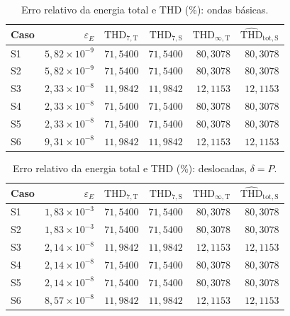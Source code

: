 \begin{table}[H]
\centering
\footnotesize\setlength{\tabcolsep}{2pt}
\caption{Erro relativo da energia total e THD (\%): ondas básicas.}\label{tab:thd1}
\begin{tabular}{lrrrrr}\hline
Caso & $\varepsilon_E$ & $\mathrm{THD}_{7,\mathrm T}$ & $\mathrm{THD}_{7,\mathrm S}$ & $\mathrm{THD}_{\infty,\mathrm T}$ & $\widehat{\mathrm{THD}}_{\mathrm{tot},\mathrm S}$ \\ \hline
S1 & $5{,}82\!\times\!10^{-9}$ & $71{,}5400$ & $71{,}5400$ & $80{,}3078$ & $80{,}3078$ \\
S2 & $5{,}82\!\times\!10^{-9}$ & $71{,}5400$ & $71{,}5400$ & $80{,}3078$ & $80{,}3078$ \\
S3 & $2{,}33\!\times\!10^{-8}$ & $11{,}9842$ & $11{,}9842$ & $12{,}1153$ & $12{,}1153$ \\
S4 & $2{,}33\!\times\!10^{-8}$ & $71{,}5400$ & $71{,}5400$ & $80{,}3078$ & $80{,}3078$ \\
S5 & $2{,}33\!\times\!10^{-8}$ & $71{,}5400$ & $71{,}5400$ & $80{,}3078$ & $80{,}3078$ \\
S6 & $9{,}31\!\times\!10^{-8}$ & $11{,}9842$ & $11{,}9842$ & $12{,}1153$ & $12{,}1153$ \\
\hline\end{tabular}
\end{table}
\begin{table}[H]
\centering
\footnotesize\setlength{\tabcolsep}{2pt}
\caption{Erro relativo da energia total e THD (\%): deslocadas, $\delta=P$.}\label{tab:thd2}
\begin{tabular}{lrrrrr}\hline
Caso & $\varepsilon_E$ & $\mathrm{THD}_{7,\mathrm T}$ & $\mathrm{THD}_{7,\mathrm S}$ & $\mathrm{THD}_{\infty,\mathrm T}$ & $\widehat{\mathrm{THD}}_{\mathrm{tot},\mathrm S}$ \\ \hline
S1 & $1{,}83\!\times\!10^{-3}$ & $71{,}5400$ & $71{,}5400$ & $80{,}3078$ & $80{,}3078$ \\
S2 & $1{,}83\!\times\!10^{-3}$ & $71{,}5400$ & $71{,}5400$ & $80{,}3078$ & $80{,}3078$ \\
S3 & $2{,}14\!\times\!10^{-8}$ & $11{,}9842$ & $11{,}9842$ & $12{,}1153$ & $12{,}1153$ \\
S4 & $2{,}14\!\times\!10^{-8}$ & $71{,}5400$ & $71{,}5400$ & $80{,}3078$ & $80{,}3078$ \\
S5 & $2{,}14\!\times\!10^{-8}$ & $71{,}5400$ & $71{,}5400$ & $80{,}3078$ & $80{,}3078$ \\
S6 & $8{,}57\!\times\!10^{-8}$ & $11{,}9842$ & $11{,}9842$ & $12{,}1153$ & $12{,}1153$ \\
\hline\end{tabular}
\end{table}
